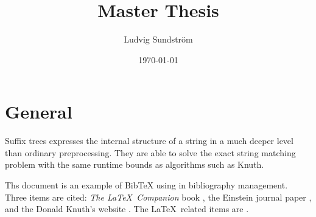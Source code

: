 \documentclass[a4paper]{article}
\title{Master Thesis}
\author{Ludvig Sundstr\"{o}m}
\date{\today}
\begin{document}
\maketitle

\section{General}

Suffix trees expresses the internal structure of a string in a much
deeper level than ordinary preprocessing. They are able to solve the
exact string matching problem with the same runtime bounds as
algorithms such as Knuth.

Ths document is an example of BibTeX using in bibliography management. Three items
are cited: \textit{The \LaTeX\ Companion} book \cite{latexcompanion}, the Einstein
journal paper \cite{einstein}, and the Donald Knuth's website \cite{knuthwebsite}.
The \LaTeX\ related items are \cite{latexcompanion,knuthwebsite}.

\medskip



\end{document}
